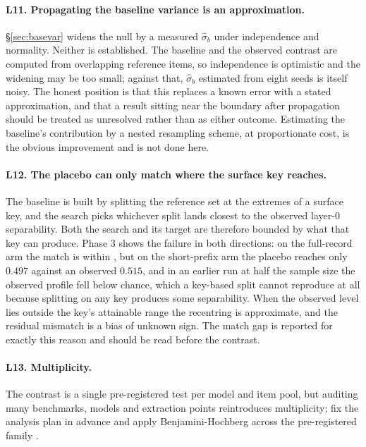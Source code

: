 \documentclass[10pt,twocolumn,letterpaper]{article}
\begin{document}
\paragraph{L11. Propagating the baseline variance is an approximation.} \S\ref{sec:basevar} widens the null by a measured $\hat\sigma_b$ under independence and normality. Neither is established. The baseline and the observed contrast are computed from overlapping reference items, so independence is optimistic and the widening may be too small; against that, $\hat\sigma_b$ estimated from eight seeds is itself noisy. The honest position is that this replaces a known error with a stated approximation, and that a result sitting near the boundary after propagation should be treated as unresolved rather than as either outcome. Estimating the baseline's contribution by a nested resampling scheme, at proportionate cost, is the obvious improvement and is not done here.

\paragraph{L12. The placebo can only match where the surface key reaches.} The baseline is built by splitting the reference set at the extremes of a surface key, and the search picks whichever split lands closest to the observed layer-0 separability. Both the search and its target are therefore bounded by what that key can produce. Phase 3 shows the failure in both directions: on the full-record arm the match is within \PthreeGapLo{}, but on the short-prefix arm the placebo reaches only $0.497$ against an observed $0.515$, and in an earlier run at half the sample size the observed profile fell below chance, which a key-based split cannot reproduce at all because splitting on any key produces some separability. When the observed level lies outside the key's attainable range the recentring is approximate, and the residual mismatch is a bias of unknown sign. The match gap is reported for exactly this reason and should be read before the contrast.

\paragraph{L13. Multiplicity.} The contrast is a single pre-registered test per model and item pool, but auditing many benchmarks, models and extraction points reintroduces multiplicity; fix the analysis plan in advance and apply Benjamini-Hochberg across the pre-registered family \cite{benjamini1995fdr}.
\end{document}
